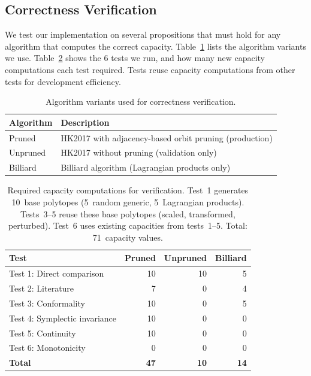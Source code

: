 %
%
%

\subsection{Correctness Verification}
\label{sec:correctness}

We test our implementation on several propositions that must hold for any
algorithm that computes the correct capacity.
Table~\ref{tab:correctness-algorithms} lists the algorithm variants we use.
Table~\ref{tab:verification-capacity-counts} shows the 6 tests we run, and
how many new capacity computations each test required. Tests reuse capacity
computations from other tests for development efficiency.

\begin{table}[h]
\centering
\begin{tabular}{ll}
\toprule
Algorithm & Description \\
\midrule
Pruned & HK2017 with adjacency-based orbit pruning (production) \\
Unpruned & HK2017 without pruning (validation only) \\
Billiard & Billiard algorithm (Lagrangian products only) \\
\bottomrule
\end{tabular}
\caption{Algorithm variants used for correctness verification.}
\label{tab:correctness-algorithms}
\end{table}

\begin{table}[h]
\centering
\small
\begin{tabular}{lrrr}
\toprule
Test & Pruned & Unpruned & Billiard \\
\midrule
Test 1: Direct comparison & 10 & 10 & 5 \\
Test 2: Literature & 7 & 0 & 4 \\
Test 3: Conformality & 10 & 0 & 5 \\
Test 4: Symplectic invariance & 10 & 0 & 0 \\
Test 5: Continuity & 10 & 0 & 0 \\
Test 6: Monotonicity & 0 & 0 & 0 \\
\midrule
\textbf{Total} & \textbf{47} & \textbf{10} & \textbf{14} \\
\bottomrule
\end{tabular}
\caption{Required capacity computations for verification. Test~1 generates
  10~base polytopes (5~random generic, 5~Lagrangian products). Tests~3--5
  reuse these base polytopes (scaled, transformed, perturbed). Test~6 uses
  existing capacities from tests~1--5. Total: 71~capacity values.}
\label{tab:verification-capacity-counts}
\end{table}

